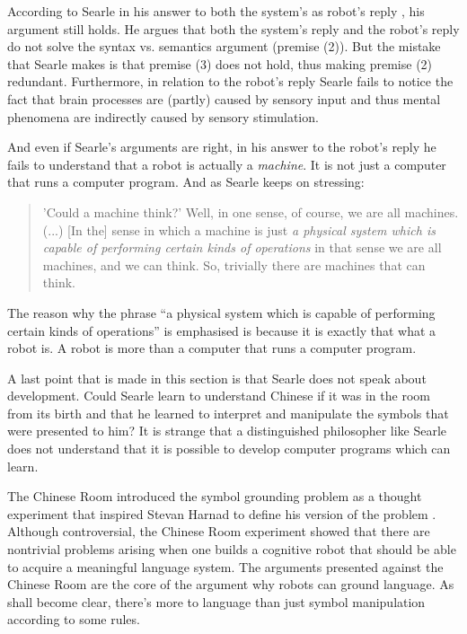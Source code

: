 According to Searle in his answer to both the system's as robot's reply \citep{searle:1984}, his argument still holds. He argues that both the system's reply and the robot's reply do not solve the syntax vs. semantics argument (premise (2)). But the mistake that Searle makes is that premise (3) does not hold, thus making premise (2) redundant. Furthermore, in relation to the robot's reply Searle fails to notice the fact that brain processes are (partly) caused by sensory input and thus mental phenomena are indirectly caused by sensory stimulation.

And even if Searle's arguments are right, in his answer to the robot's reply he fails to understand that a robot is actually a {\em machine}. It is not just a computer that runs a computer program. And as Searle keeps on stressing:

\begin{quote}
'Could a machine think?' Well, in one sense, of course, we are all machines. (...) [In the] sense in which a machine is just {\em a physical system which is capable of performing certain kinds of operations} in that sense we are all machines, and we can think. So, trivially there are machines that can think. \cite[p. 35, my italics]{searle:1984}
\end{quote}

The reason why the phrase ``a physical system which is capable of performing certain kinds of operations'' is emphasised is because it is exactly that what a robot is. A robot is more than a computer that runs a computer program.

A last point that is made in this section is that Searle does not speak about development. Could Searle learn to understand Chinese if it was in the room from its birth and that he learned to interpret and manipulate the symbols that were presented to him? It is strange that a distinguished philosopher like Searle does not understand that it is possible to develop computer programs which can learn.

\bigskip\noindent
{}
The Chinese Room introduced the symbol grounding problem as a thought experiment that inspired Stevan Harnad to define his version of the problem \citep{harnad:1990}. Although controversial, the Chinese Room experiment showed that there are nontrivial problems arising when one builds a cognitive robot that should be able to acquire a meaningful language system. The arguments presented against the Chinese Room are the core of the argument why robots can ground language. As shall become clear, there's more to language than just symbol manipulation according to some rules.

